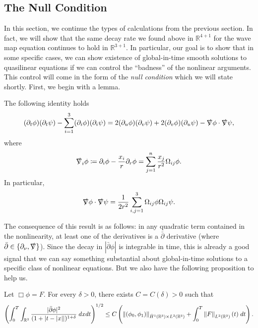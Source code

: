 \documentclass{article}
\begin{document}
\subsection{The Null Condition} 
In this section, we continue the types of calculations from the previous section. In fact, we will show that the same decay rate we found above in $\mathbb{R}^{4 + 1}$ for the wave map equation continues to hold in $\mathbb{R}^{3 + 1}$. In particular, our goal is to show that in some specific cases, we can show existence of global-in-time smooth solutions to quasilinear equations if we can control the ``badness'' of the nonlinear arguments. This control will come in the form of the \textit{null condition} which we will state shortly. First, we begin with a lemma. 
\begin{lemma}
	The following identity holds 
	\begin{equation*}
		(\partial_{t}\phi)(\partial_{t}\psi) -\sum_{i = 1}^{3}(\partial_{i}\phi)(\partial_{i}\psi) = 2(\partial_{u}\phi)(\partial_{v}\psi) + 2(\partial_{v}\phi)(\partial_{u}\psi) - \slashed\nabla\phi \cdot \slashed\nabla \psi, 
	\end{equation*} 
	where 
	\begin{equation*}
		\slashed\nabla_{i}\phi \coloneqq \partial_{i}\phi - \frac{x_{i}}{r}\partial_{r}\phi = \sum_{j = 1}^{n}\frac{x_{j}}{r^{2}}\Omega_{ij}\phi. 
	\end{equation*} 
	In particular, 
	\begin{equation*}
		\slashed\nabla \phi \cdot \slashed\nabla \psi = \frac{1}{2r^{2}}\sum_{i,j=1}^{3}\Omega_{ij}\phi\Omega_{ij}\psi. 
	\end{equation*} 
\end{lemma} 
The consequence of this result is as follows: in any quadratic term contained in the nonlinearity, at least one of the derivatives is a $\bar{\partial}$ derivative (where $\bar{\partial} \in \{\partial_{\nu}, \slashed\nabla\}$). Since the decay in $|\bar{\partial}\phi|$ is integrable in time, this is already a good signal that we can say something substantial about global-in-time solutions to a specific class of nonlinear equations. But we also have the following proposition to help us. 
\begin{prop}
	Let $\Box\phi = F$. For every $\delta > 0$, there exists $C = C(\delta) > 0$ such that 
	\begin{equation*}
		\left(\int_{0}^{T}\int_{\mathbb{R}^{3}}\frac{|\bar{\partial}\phi|^{2}}{(1 + |t- |x||)^{1 + \delta}}\;dxdt\right)^{1/2} \leq C\left(\left\Vert (\phi_{0}, \phi_{1}) \right\Vert_{\dot{H}^{1}(\mathbb{R}^{3}) \times L^{2}(\mathbb{R}^{3})} + \int_{0}^{T}\left\Vert F \right\Vert_{L^{2}(\mathbb{R}^{3})}(t)\;dt\right). 
	\end{equation*} 
\end{prop} 
\end{document}
